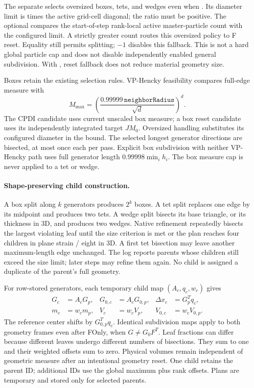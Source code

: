The separate  selects oversized
boxes, tets, and wedges even when . Its diameter
limit is  times the active
grid-cell diagonal; the ratio must be positive. The optional
 compares the
start-of-step rank-local active master-particle count with the configured limit.
A strictly greater count routes this oversized policy to F reset. Equality
still permits splitting; $-1$ disables this fallback. This is not a hard global
particle cap and does not disable independently enabled general subdivision.
With , reset fallback does not reduce material
geometry size.

Boxes retain the existing selection rules. VP-Hencky feasibility compares
full-edge measure with
\begin{equation}
 M_{\max}=\left(\frac{0.99999\,\texttt{neighborRadius}}{\sqrt d}\right)^d.
\end{equation}
The CPDI candidate uses current unscaled box measure; a box reset candidate
uses its independently integrated target $J M_0$. Oversized handling substitutes
its configured diameter in the bound. The selected longest generator directions
are bisected, at most once each per pass. Explicit box subdivision with neither
VP-Hencky path uses full generator length $0.99998\min_i h_i$. The box measure
cap is never applied to a tet or wedge.

\paragraph{Shape-preserving child construction.}
A box split along $k$ generators produces $2^k$ boxes. A tet split replaces one
edge by its midpoint and produces two tets. A wedge split bisects its base
triangle, or its thickness in 3D, and produces two wedges. Native refinement
repeatedly bisects the largest violating leaf until the size criterion is met
or the plan reaches four children in plane strain / eight in 3D. A first tet
bisection may leave another maximum-length edge unchanged. The log reports
parents whose children still exceed the size limit; later steps may refine them
again. No child is assigned a duplicate of the parent's full geometry.

For row-stored generators, each temporary child map $(A_c,q_c,w_c)$ gives
\begin{align}
 G_c&=A_c G_p, &G_{0,c}&=A_c G_{0,p}, &\Delta x_c&=G_p^Tq_c,\\
 m_c&=w_cm_p, &V_c&=w_cV_p, &V_{0,c}&=w_cV_{0,p}.
\end{align}
The reference center shifts by $G_{0,p}^Tq_c$. Identical subdivision maps apply
to both geometry frames even after FOnly, when $G\ne G_0F^T$. Leaf fractions
can differ because different leaves undergo different numbers of bisections.
They sum to one and their weighted offsets sum to zero. Physical volumes
remain independent of geometric measure after an intentional geometry reset.
One child retains the parent ID; additional IDs use the global maximum plus
rank offsets. Plans are temporary and stored only for selected parents.

